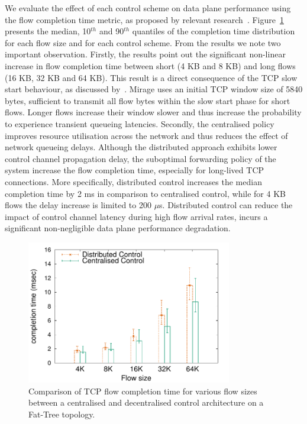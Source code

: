 We evaluate the effect of each control scheme on data plane performance using
the flow completion time metric, as proposed by relevant
research~. Figure~\ref{fig:sdnsim-use-case-result}
presents the median, 10$^{th}$ and 90$^{th}$ quantiles of the completion time
distribution for each flow size and for each control scheme. From the results
we note two important observation. Firstly, the results point out the
significant non-linear increase in flow completion time between short (4 KB and
8 KB) and long flows (16 KB, 32 KB and 64 KB). This result is a direct
consequence of the TCP slow start behaviour, as discussed
by~\citet{Dukkipati10}. Mirage uses an initial TCP window size of 5840 bytes,
sufficient to transmit all flow bytes within the slow start phase for short
flows. Longer flows increase their window slower and thus increase the
probability to experience transient queueing latencies. Secondly, the
centralised policy improves resource utilisation across the network and thus
reduces the effect of network queueing delays. Although the distributed
approach exhibits lower control channel propagation delay, the suboptimal
forwarding policy of the system increase the flow completion time, especially
for long-lived TCP connections. More specifically, distributed control
increases the median completion time by 2 ms in comparison to centralised
control, while for 4 KB flows the delay increase is limited to 200 $\mu$s.
Distributed control can reduce the impact of control channel latency during
high flow arrival rates, incurs a significant non-negligible data plane
performance degradation.



\begin{figure}[h]
  \begin{center}
    \includegraphics[width=0.80\textwidth]{Chapter1/Chapter1Figs/sdnsim-use-case}
  \end{center}
  \caption[Hierarchical control evaluation using TCP flow completion
  time]{Comparison of TCP flow completion time for various flow sizes between a
  centralised and decentralised control architecture on a Fat-Tree topology.}
  \label{fig:sdnsim-use-case-result}
\end{figure}


